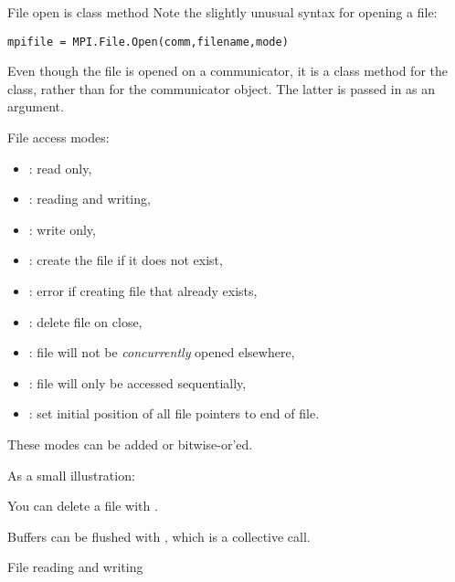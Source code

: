 \begin{pythonnote}{File open is class method}
  Note the slightly unusual syntax for opening a file:
\begin{lstlisting}
mpifile = MPI.File.Open(comm,filename,mode)
\end{lstlisting}
  Even though the file is
  opened on a communicator, it is a class method for the 
  class, rather than for the communicator object. The latter is passed
  in as an argument.
\end{pythonnote}

File access modes:
\begin{itemize}
\item  {}: read only,
\item  {}: reading and writing,
\item  {}: write only,
\item  {}: create the file if it does not exist,
\item  {}: error if creating file that already exists,
\item  {}: delete file on close,
\item  {}: file will not be
  \emph{concurrently}
  opened elsewhere,
\item  {}: file will only be accessed sequentially,
\item  {}: set initial position of all file pointers to end
  of file.
\end{itemize}
These modes can be added or bitwise-or'ed.

As a small illustration:

You can delete a file with .

Buffers can be flushed with , which is a collective call.

 {File reading and writing}

